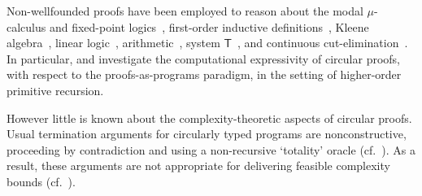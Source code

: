\documentclass[manuscript,screen]{acmart}
\newcommand{\purple}[1]{{\color{purple}#1}}
\newcommand{\anupam}[1]{\todo{A: #1}}
\newcommand{\toappendix}[1]{\purple{#1}}
\theoremstyle{definition}
\theoremstyle{remark}
\newcommand{\tgodel}{\mathsf{T}}
\begin{document}


Non-wellfounded proofs have been employed to  reason about the modal $\mu$-calculus and fixed-point logics~\cite{niwinski1996games,dax2006proof}, first-order inductive definitions~\cite{brotherston2011sequent},  Kleene algebra~\cite{das2017cut,DP18},  linear logic~\cite{baelde2016infinitary,DeSaurin-infinets}, arithmetic~\cite{Simpson17-cyclic-arithmetic,BerardiTatsuta,das2018logical},  system $\tgodel$~\cite{Das2021-preprint,Kuperberg-Pous21, Das2021}, and continuous cut-elimination~\cite{mints1978finite, fortier2013cuts,bouncing-threads}. 
In particular,  \cite{Kuperberg-Pous21} and \cite{Das2021,Das2021-preprint} investigate the computational expressivity of circular proofs, with respect to the proofs-as-programs paradigm, in the setting of higher-order primitive recursion.


However little is known about the complexity-theoretic aspects of circular proofs.
Usual termination arguments for circularly typed programs are nonconstructive, proceeding by contradiction and using a non-recursive `totality' oracle (cf.~\cite{Kuperberg-Pous21,Das2021,Das2021-preprint}). 
As a result, these arguments are not appropriate for delivering feasible complexity bounds (cf.~\cite{das2018logical}).
%
\end{document}
